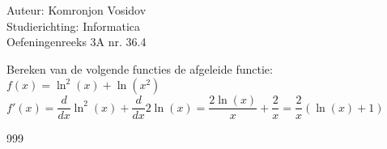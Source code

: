 \documentclass[a4paper]{article}
\begin{document}
	
	\noindent \large Auteur: Komronjon Vosidov \\
	\noindent \large Studierichting: Informatica\\
	\noindent \large Oefeningenreeks 3A nr. 36.4\\
	
	\medskip
	
	\normalsize
	Bereken van de volgende functies de afgeleide functie:\\
	
	$f(x) = \ln^2(x) + \ln(x^2)$\\
	
	$f'(x) = \dfrac{d}{dx} \ln^2(x) + \dfrac{d}{dx} 2\ln(x) = \dfrac{2 \ln(x)}{x} + \dfrac{2}{x}=\dfrac{2}{x} \left( \ln(x) + 1 \right)$

	
	
	\begin{thebibliography}{999}
	\end{thebibliography}	
	
\end{document}
